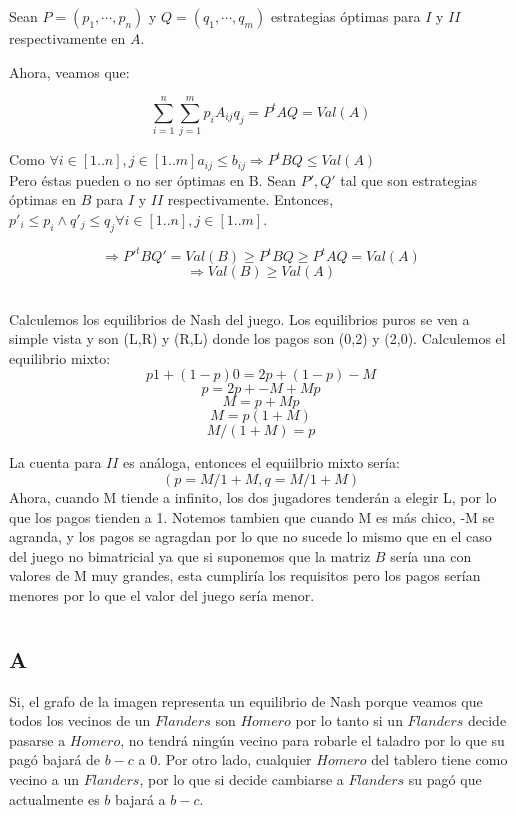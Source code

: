 \documentclass[a4paper]{article}
\begin{document}
Sean $P = (p_1,\cdots,p_n)$ y $Q = (q_1,\cdots,q_m)$ estrategias óptimas para $I$ y $II$ respectivamente en $A$.

Ahora, veamos que:

$$\sum^{n}_{i=1}\sum^{m}_{j=1}p_{i}A_{ij}q_j = P^tAQ = Val(A)$$

Como $\forall i \in [ 1..n ] , j \in [ 1 .. m ] a_{ij} \leq b_{ij} \Rightarrow P^tBQ \leq Val(A)$\\

Pero éstas pueden o no ser óptimas en B. Sean $P',Q'$ tal que son estrategias óptimas en $B$ para $I$ y $II$ respectivamente. Entonces, $p'_i \leq p_i \land q'_j \leq q_j \forall i \in [ 1..n ] , j \in [ 1 .. m ]$.

$$\Rightarrow P'^t B Q' = Val(B) \geq P^tBQ \geq P^t AQ = Val(A)$$
$$\Rightarrow Val(B) \geq Val(A)$$

\subsection{}

Calculemos los equilibrios de Nash del juego.
Los equilibrios puros se ven a simple vista y son (L,R) y (R,L) donde los pagos son (0,2) y (2,0). Calculemos el equilibrio mixto:\\

$$p1 + (1-p)0 = 2p + (1-p)-M$$
$$p           = 2p + -M+ Mp$$
$$M           = p + Mp$$
$$M           = p (1+M)$$
$$M/(1+M)           = p $$

La cuenta para $II$ es análoga, entonces el equiilbrio mixto sería:
$$(p=M/1+M,q=M/1+M)$$
Ahora, cuando M tiende a infinito, los dos jugadores tenderán a elegir L, por lo que los pagos tienden a 1.
Notemos tambien que cuando M es más chico, -M se agranda, y los pagos se agragdan por lo que no sucede lo mismo que en el caso del juego no bimatricial ya que si suponemos que la matriz $B$ sería una con valores de M muy grandes, esta cumpliría los requisitos pero los pagos serían menores por lo que el valor del juego sería menor.




\section{}

\subsection{A}
Si, el grafo de la imagen representa un equilibrio de Nash porque veamos que todos los vecinos de un $Flanders$ son $Homero$ por lo tanto si un $Flanders$ decide pasarse a $Homero$, no tendrá ningún vecino para robarle el taladro por lo que su pagó bajará de $b-c$ a 0. Por otro lado, cualquier $Homero$ del tablero tiene como vecino a un $Flanders$, por lo que si decide cambiarse a $Flanders$ su pagó que actualmente es $b$ bajará a $b-c$.
\end{document}
